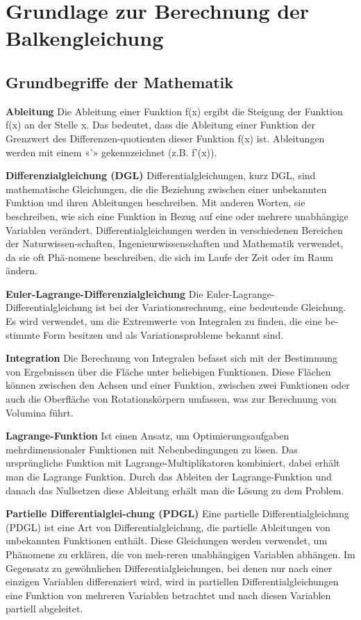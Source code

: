 %
%
%
%
\section{Grundlage zur Berechnung der Balkengleichung
\label{balken:section:teil1}}
\subsection{Grundbegriffe der Mathematik}
\textbf{Ableitung}
Die Ableitung einer Funktion f(x) ergibt die Steigung der Funktion f(x) an der Stelle x.
Das bedeutet, dass die Ableitung einer Funktion der Grenzwert des Differenzen-quotienten dieser Funktion f(x) ist.
Ableitungen werden mit einem «’» gekennzeichnet (z.B. f’(x)).

\textbf{Differenzialgleichung (DGL)}
Differentialgleichungen, kurz DGL, sind mathematische Gleichungen, die die Beziehung zwischen einer unbekannten Funktion und ihren Ableitungen beschreiben.
Mit anderen Worten, sie beschreiben, wie sich eine Funktion in Bezug auf eine oder mehrere unabhängige Variablen verändert.
Differentialgleichungen werden in verschiedenen Bereichen der Naturwissen-schaften, Ingenieurwissenschaften und Mathematik verwendet, da sie oft Phä-nomene beschreiben, die sich im Laufe der Zeit oder im Raum ändern.

\textbf{Euler-Lagrange-Differenzialgleichung}
Die Euler-Lagrange-Differentialgleichung ist bei der Variationsrechnung, eine bedeutende Gleichung.
Es wird verwendet, um die Extremwerte von Integralen zu finden, die eine be-stimmte Form besitzen und als Variationsprobleme bekannt sind.

\textbf{Integration}
Die Berechnung von Integralen befasst sich mit der Bestimmung von Ergebnissen über die Fläche unter beliebigen Funktionen.
Diese Flächen können zwischen den Achsen und einer Funktion, zwischen zwei Funktionen oder auch die Oberfläche von Rotationskörpern umfassen, was zur Berechnung von Volumina führt.

\textbf{Lagrange-Funktion}
Ist einen Ansatz, um Optimierungsaufgaben mehrdimensionaler Funktionen mit Nebenbedingungen zu lösen.
Das ursprüngliche Funktion mit Lagrange-Multiplikatoren kombiniert, dabei erhält man die Lagrange Funktion.
Durch das Ableiten der Lagrange-Funktion und danach das Nullsetzen diese Ableitung erhält man die Lösung zu dem Problem.

\textbf{Partielle Differentialglei-chung (PDGL)}
Eine partielle Differentialgleichung (PDGL) ist eine Art von Differentialgleichung, die partielle Ableitungen von unbekannten Funktionen enthält.
Diese Gleichungen werden verwendet, um Phänomene zu erklären, die von meh-reren unabhängigen Variablen abhängen.
Im Gegensatz zu gewöhnlichen Differentialgleichungen, bei denen nur nach einer einzigen Variablen differenziert wird, wird in partiellen Differentialgleichungen eine Funktion von mehreren Variablen betrachtet und nach diesen Variablen partiell abgeleitet.

